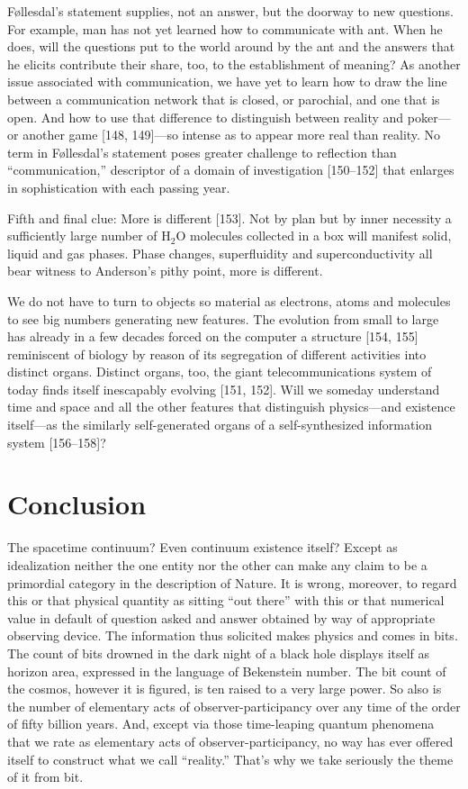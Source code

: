 \documentclass[11pt]{article}
\begin{document}
	Føllesdal's statement supplies, not an answer, but the doorway to new questions.
	For example, man has not yet learned how to communicate with ant. When he
	does, will the questions put to the world around by the ant and the answers that he
	elicits contribute their share, too, to the establishment of meaning? As another issue
	associated with communication, we have yet to learn how to draw the line between
	a communication network that is closed, or parochial, and one that is open. And
	how to use that difference to distinguish between reality and poker---or another
	game [148, 149]---so intense as to appear more real than reality. No term in
	Føllesdal's statement poses greater challenge to reflection than ``communication,''
	descriptor of a domain of investigation [150--152] that enlarges in sophistication with
	each passing year.
	
	Fifth and final clue: More is different [153]. Not by plan but by inner necessity
	a sufficiently large number of H$_2$O molecules collected in a box will manifest solid,
	liquid and gas phases. Phase changes, superfluidity and superconductivity all bear
	witness to Anderson's pithy point, more is different.
	
	We do not have to turn to objects so material as electrons, atoms and molecules
	to see big numbers generating new features. The evolution from small to large has
	already in a few decades forced on the computer a structure [154, 155] reminiscent
	of biology by reason of its segregation of different activities into distinct organs.
	Distinct organs, too, the giant telecommunications system of today finds itself inescapably evolving [151, 152]. Will we someday understand time and space and all
	the other features that distinguish physics---and existence itself---as the similarly
	self-generated organs of a self-synthesized information system [156--158]?
	
	\section{Conclusion}
	The spacetime continuum? Even continuum existence itself? Except as idealization neither the one entity nor the other can make any claim to be a primordial
	category in the description of Nature. It is wrong, moreover, to regard this or that
	physical quantity as sitting ``out there'' with this or that numerical value in default
	of question asked and answer obtained by way of appropriate observing device.
	The information thus solicited makes physics and comes in bits. The count of bits
	drowned in the dark night of a black hole displays itself as horizon area, expressed
	in the language of Bekenstein number. The bit count of the cosmos, however it is
	figured, is ten raised to a very large power. So also is the number of elementary
	acts of observer-participancy over any time of the order of fifty billion years. And,
	except via those time-leaping quantum phenomena that we rate as elementary acts
	of observer-participancy, no way has ever offered itself to construct what we call
	``reality.'' That's why we take seriously the theme of it from bit.
	
\end{document}
